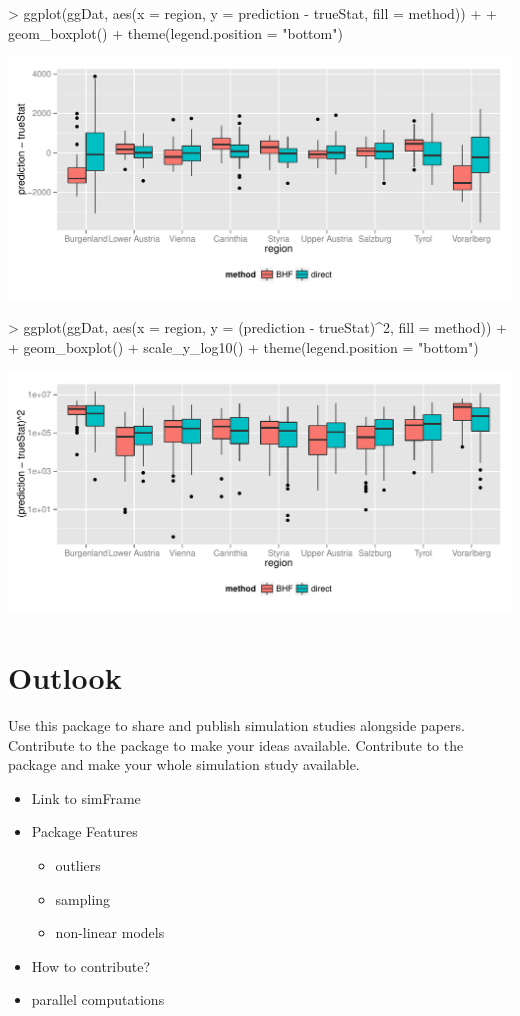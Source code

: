 \documentclass[article]{ajs}
\begin{document}
\begin{Schunk}
\begin{Sinput}
> ggplot(ggDat, aes(x = region, y = prediction - trueStat, fill = method)) + 
+   geom_boxplot() + theme(legend.position = "bottom")
\end{Sinput}
\end{Schunk}

\includegraphics[width = \textwidth]{saeSim-designSimBIAS.pdf}

\begin{Schunk}
\begin{Sinput}
> ggplot(ggDat, aes(x = region, y = (prediction - trueStat)^2, fill = method)) + 
+   geom_boxplot() + scale_y_log10() + theme(legend.position = "bottom")
\end{Sinput}
\end{Schunk}

\includegraphics[width = \textwidth]{saeSim-designSimMSE.pdf}

  
\section{Outlook}
Use this package to share and publish simulation studies alongside papers. Contribute to the package to make your ideas available. Contribute to the package and make your whole simulation study available. 
\begin{itemize}
	\item Link to simFrame
	\item Package Features
	\begin{itemize}
		\item outliers
		\item sampling
		\item non-linear models
	\end{itemize}
	\item How to contribute?
	\item parallel computations
\end{itemize}


%

\end{document}
